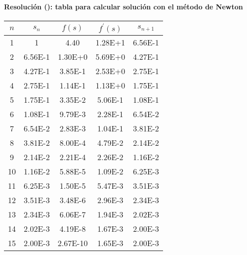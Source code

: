 \begin{frame}
	\frametitle{\ejerciciocmd}
	\framesubtitle{Resolución (): tabla para calcular solución con el método de Newton}
	\begin{center}
		{\footnotesize
			\begin{tabular}{SSSSS}
				\toprule
					{$n$}	& {$s_{n}$}	& {$f(s)$}	& {$f^\prime(s)$}	& {$s_{n+1}$}	\\
						& 1			& 4.40		& 1.28E+1			& 6.56E-1		\\
					2		& 6.56E-1	& 1.30E+0	& 5.69E+0			& 4.27E-1		\\
					3		& 4.27E-1	& 3.85E-1	& 2.53E+0			& 2.75E-1		\\
					4		& 2.75E-1	& 1.14E-1	& 1.13E+0			& 1.75E-1		\\
					5		& 1.75E-1	& 3.35E-2	& 5.06E-1			& 1.08E-1		\\
					6		& 1.08E-1	& 9.79E-3	& 2.28E-1			& 6.54E-2		\\
					7		& 6.54E-2	& 2.83E-3	& 1.04E-1			& 3.81E-2		\\
					8		& 3.81E-2	& 8.00E-4	& 4.79E-2			& 2.14E-2		\\
					9		& 2.14E-2	& 2.21E-4	& 2.26E-2			& 1.16E-2		\\
					10		& 1.16E-2	& 5.88E-5	& 1.09E-2			& 6.25E-3		\\
					11		& 6.25E-3	& 1.50E-5	& 5.47E-3			& 3.51E-3		\\
					12		& 3.51E-3	& 3.48E-6	& 2.96E-3			& 2.34E-3		\\
					13		& 2.34E-3	& 6.06E-7	& 1.94E-3			& 2.02E-3		\\
					14		& 2.02E-3	& 4.19E-8	& 1.67E-3			& 2.00E-3		\\
					15		& 2.00E-3	& 2.67E-10	& 1.65E-3			& 2.00E-3		\\
				\bottomrule
			\end{tabular}
		}
	\end{center}
\end{frame}

